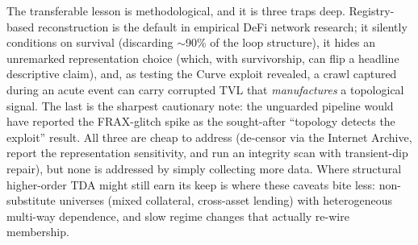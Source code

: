 \documentclass[10pt,twocolumn]{article}
\begin{document}
The transferable lesson is methodological, and it is three traps deep. Registry-based
reconstruction is the default in empirical DeFi network research; it silently conditions on
survival (discarding $\sim$90\% of the loop structure), it hides an unremarked representation
choice (which, with survivorship, can flip a headline descriptive claim), and, as testing
the Curve exploit revealed, a crawl captured during an acute event can carry corrupted TVL
that \emph{manufactures} a topological signal. The last is the sharpest cautionary note: the
unguarded pipeline would have reported the FRAX-glitch spike as the sought-after ``topology
detects the exploit'' result. All three are cheap to address (de-censor via the Internet
Archive, report the representation sensitivity, and run an integrity scan with
transient-dip repair), but none is addressed by simply collecting more data. Where structural higher-order
TDA might still earn its keep is where these caveats bite less: non-substitute universes
(mixed collateral, cross-asset lending) with heterogeneous multi-way dependence, and slow
regime changes that actually re-wire membership.
\end{document}
